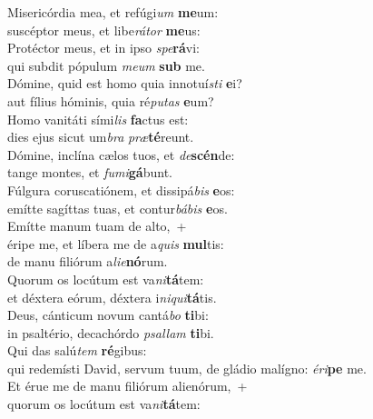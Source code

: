 \evenverse Misericórdia mea, et refúgi\textit{um} \textbf{me}um:~\*\\
\evenverse suscéptor meus, et libe\textit{rá}\textit{tor} \textbf{me}us:\\
\oddverse Protéctor meus, et in ipso \textit{spe}\textbf{rá}vi:~\*\\
\oddverse qui subdit pópulum \textit{me}\textit{um} \textbf{sub} me.\\
\evenverse Dómine, quid est homo quia innotuí\textit{sti} \textbf{e}i?~\*\\
\evenverse aut fílius hóminis, quia ré\textit{pu}\textit{tas} \textbf{e}um?\\
\oddverse Homo vanitáti sími\textit{lis} \textbf{fa}ctus est:~\*\\
\oddverse dies ejus sicut um\textit{bra} \textit{præ}\textbf{té}reunt.\\
\evenverse Dómine, inclína cælos tuos, et \textit{de}\textbf{scén}de:~\*\\
\evenverse tange montes, et \textit{fu}\textit{mi}\textbf{gá}bunt.\\
\oddverse Fúlgura coruscatiónem, et dissipá\textit{bis} \textbf{e}os:~\*\\
\oddverse emítte sagíttas tuas, et contur\textit{bá}\textit{bis} \textbf{e}os.\\
\evenverse Emítte manum tuam de alto,~+\\
\evenverse  éripe me, et líbera me de a\textit{quis} \textbf{mul}tis:~\*\\
\evenverse de manu filiórum a\textit{li}\textit{e}\textbf{nó}rum.\\
\oddverse Quorum os locútum est va\textit{ni}\textbf{tá}tem:~\*\\
\oddverse et déxtera eórum, déxtera i\textit{ni}\textit{qui}\textbf{tá}tis.\\
\evenverse Deus, cánticum novum cantá\textit{bo} \textbf{ti}bi:~\*\\
\evenverse in psaltério, decachórdo \textit{psal}\textit{lam} \textbf{ti}bi.\\
\oddverse Qui das salú\textit{tem} \textbf{ré}gibus:~\*\\
\oddverse qui redemísti David, servum tuum, de gládio malígno: \textit{é}\textit{ri}\textbf{pe} me.\\
\evenverse Et érue me de manu filiórum alienórum,~+\\
\evenverse  quorum os locútum est va\textit{ni}\textbf{tá}tem:~\*\\
